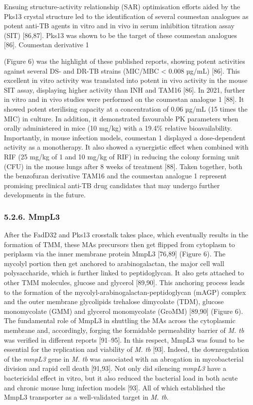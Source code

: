 \documentclass{article}
\begin{document}
Ensuing structure-activity relationship (SAR) optimisation efforts aided by the Pks13 crystal structure led to the identification of several coumestan analogues as potent anti-TB agents in vitro and in vivo in serum inhibition titration assay (SIT) [86,87]. Pks13 was shown to be the target of these coumestan analogues [86]. Coumestan derivative 1

(Figure 6) was the highlight of these published reports, showing potent activities against several DS- and DR-TB strains (MIC/MBC < 0.008 µg/mL) [86]. This excellent in vitro activity was translated into potent in vivo activity in the mouse SIT assay, displaying higher activity than INH and TAM16 [86]. In 2021, further in vitro and in vivo studies were performed on the coumestan analogue 1 [88]. It showed potent sterilising capacity at a concentration of 0.06 µg/mL (15 times the MIC) in culture. In addition, it demonstrated favourable PK parameters when orally administered in mice (10 mg/kg) with a 19.4\% relative bioavailability. Importantly, in mouse infection models, coumestan 1 displayed a dose-dependent activity as a monotherapy. It also showed a synergistic effect when combined with RIF (25 mg/kg of 1 and 10 mg/kg of RIF) in reducing the colony forming unit (CFU) in the mouse lungs after 8 weeks of treatment [88]. Taken together, both the benzofuran derivative TAM16 and the coumestan analogue 1 represent promising preclinical anti-TB drug candidates that may undergo further developments in the future.

\subsubsection{5.2.6. MmpL3}

After the FadD32 and Pks13 crosstalk takes place, which eventually results in the formation of TMM, these MAs precursors then get flipped from cytoplasm to periplasm via the inner membrane protein MmpL3 [76,89] (Figure 6). The mycolyl portion then get anchored to arabinogalactan, the major cell wall polysaccharide, which is further linked to peptidoglycan. It also gets attached to other TMM molecules, glucose and glycerol [89,90]. This anchoring process leads to the formation of the mycolyl-arabinogalactan-peptidoglycan (mAGP) complex and the outer membrane glycolipids trehalose dimycolate (TDM), glucose monomycolate (GMM) and glycerol monomycolate (GroMM) [89,90] (Figure 6). The fundamental role of MmpL3 in shuttling the MAs across the cytoplasmic membrane and, accordingly, forging the formidable permeability barrier of \textit{M. tb} was verified in different reports [91–95]. In this respect, MmpL3 was found to be essential for the replication and viability of \textit{M. tb} [93]. Indeed, the downregulation of the \textit{mmpL3} gene in \textit{M. tb} was associated with an abrogation in mycobacterial division and rapid cell death [91,93]. Not only did silencing \textit{mmpL3} have a bactericidal effect in vitro, but it also reduced the bacterial load in both acute and chronic mouse lung infection models [93]. All of which established the MmpL3 transporter as a well-validated target in \textit{M. tb}.
\end{document}
